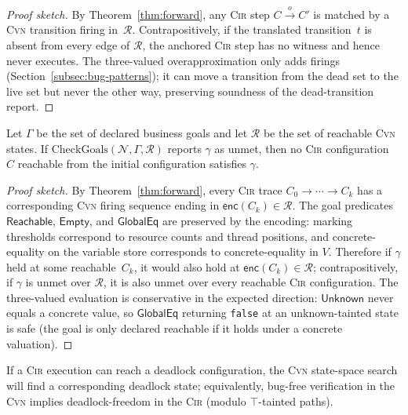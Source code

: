 \begin{proof}[Proof sketch]
By Theorem~\ref{thm:forward}, any \textsc{Cir} step $C\xrightarrow{o}C'$
is matched by a \textsc{Cvn} transition firing in~$\mathcal{R}$.
Contrapositively, if the translated transition~$t$ is absent from every
edge of $\mathcal{R}$, the anchored \textsc{Cir} step has no witness
and hence never executes. The three-valued overapproximation only adds
firings (Section~\ref{subsec:bug-patterns}); it can move a transition
from the dead set to the live set but never the other way, preserving
soundness of the dead-transition report.
\end{proof}

\begin{theorem}
\label{thm:goal-soundness}
Let $\Gamma$ be the set of declared business goals and let
$\mathcal{R}$ be the set of reachable \textsc{Cvn} states. If
$\text{CheckGoals}(\mathcal{N},\Gamma,\mathcal{R})$ reports $\gamma$ as
unmet, then no \textsc{Cir} configuration~$C$ reachable from the
initial configuration satisfies $\gamma$.
\end{theorem}

\begin{proof}[Proof sketch]
By Theorem~\ref{thm:forward}, every \textsc{Cir} trace $C_0\to\cdots\to
C_k$ has a corresponding \textsc{Cvn} firing sequence ending in
$\mathsf{enc}(C_k)\in\mathcal{R}$. The goal predicates
$\mathsf{Reachable}$, $\mathsf{Empty}$, and $\mathsf{GlobalEq}$ are
preserved by the encoding: marking thresholds correspond to resource
counts and thread positions, and concrete-equality on the variable
store corresponds to concrete-equality in $V$. Therefore if
$\gamma$ held at some reachable~$C_k$, it would also hold at
$\mathsf{enc}(C_k)\in\mathcal{R}$; contrapositively, if
$\gamma$ is unmet over $\mathcal{R}$, it is also unmet over every
reachable \textsc{Cir} configuration. The three-valued evaluation is
conservative in the expected direction: $\mathsf{Unknown}$ never equals
a concrete value, so $\mathsf{GlobalEq}$ returning \texttt{false} at an
unknown-tainted state is safe (the goal is only declared reachable if
it holds under a concrete valuation).
\end{proof}

\begin{theorem}[Soundness]
\label{thm:soundness}
If a \textsc{Cir} execution can reach a deadlock configuration, the
\textsc{Cvn} state-space search will find a corresponding deadlock
state; equivalently, bug-free verification in the \textsc{Cvn}
implies deadlock-freedom in the \textsc{Cir} (modulo
$\top$-tainted paths).
\end{theorem}


